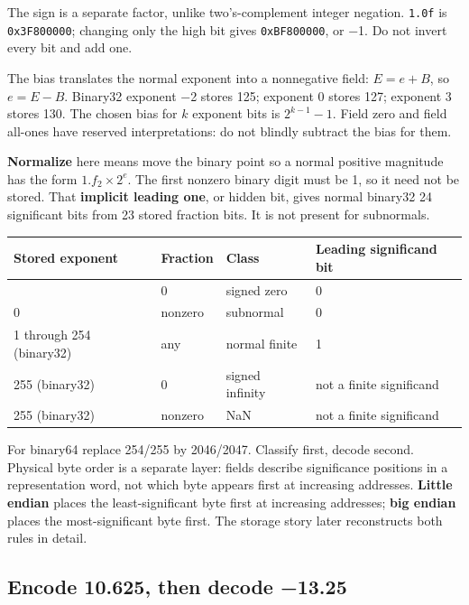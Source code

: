 The sign is a separate factor, unlike two's-complement integer negation. \texttt{1.0f} is \texttt{0x3F800000}; changing only the high bit gives \texttt{0xBF800000}, or −1. Do not invert every bit and add one.

The bias translates the normal exponent into a nonnegative field: \(E=e+B\), so \(e=E-B\). Binary32 exponent −2 stores 125; exponent 0 stores 127; exponent 3 stores 130. The chosen bias for \(k\) exponent bits is \(2^{k-1}-1\). Field zero and field all-ones have reserved interpretations: do not blindly subtract the bias for them.

\textbf{Normalize} here means move the binary point so a normal positive magnitude has the form \(1.f_2\times2^e\). The first nonzero binary digit must be 1, so it need not be stored. That \textbf{implicit leading one}, or hidden bit, gives normal binary32 24 significant bits from 23 stored fraction bits. It is not present for subnormals.

{\def\LTcaptype{none} %
\begin{longtable}[]{@{}llll@{}}
\toprule\noalign{}
Stored exponent & Fraction & Class & Leading significand bit \\
\midrule\noalign{}
\endhead
\bottomrule\noalign{}
\endlastfoot
0 & 0 & signed zero & 0 \\
0 & nonzero & subnormal & 0 \\
1 through 254 (binary32) & any & normal finite & 1 \\
255 (binary32) & 0 & signed infinity & not a finite significand \\
255 (binary32) & nonzero & NaN & not a finite significand \\
\end{longtable}
}

For binary64 replace 254/255 by 2046/2047. Classify first, decode second. Physical byte order is a separate layer: fields describe significance positions in a representation word, not which byte appears first at increasing addresses. \textbf{Little endian} places the least-significant byte first at increasing addresses; \textbf{big endian} places the most-significant byte first. The storage story later reconstructs both rules in detail.

\subsection{Encode 10.625, then decode −13.25}\label{05-engine-i-ch001-encode-10.625-then-decode-13.25}

